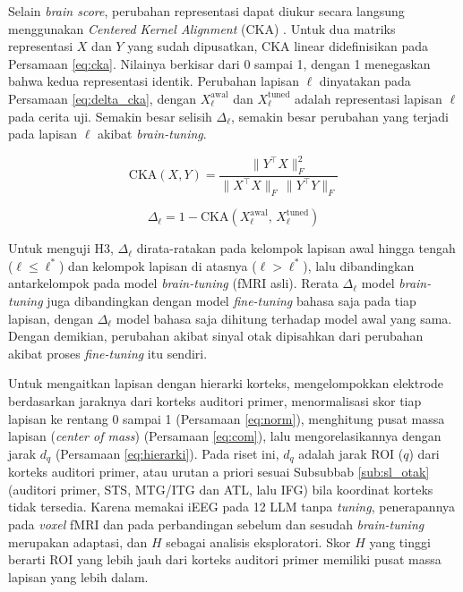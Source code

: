Selain \textit{brain score}, perubahan representasi dapat diukur secara langsung menggunakan \textit{Centered Kernel Alignment} (CKA) \autocite{kornblith2019similarity}. Untuk dua matriks representasi $X$ dan $Y$ yang sudah dipusatkan, CKA linear didefinisikan pada Persamaan \ref{eq:cka}. Nilainya berkisar dari 0 sampai 1, dengan 1 menegaskan bahwa kedua representasi identik. Perubahan lapisan $\ell$ dinyatakan pada Persamaan \ref{eq:delta_cka}, dengan $X^{\text{awal}}_{\ell}$ dan $X^{\text{tuned}}_{\ell}$ adalah representasi lapisan $\ell$ pada cerita uji. Semakin besar selisih $\Delta_\ell$, semakin besar perubahan yang terjadi pada lapisan $\ell$ akibat \textit{brain-tuning}.
 
\begin{equation}
  \mathrm{CKA}(X,Y) = \frac{\lVert Y^{\top}X \rVert_F^{2}}{\lVert X^{\top}X \rVert_F\,\lVert Y^{\top}Y \rVert_F}
  \label{eq:cka}
\end{equation}

\begin{equation}
  \Delta_\ell = 1 - \mathrm{CKA}\left(X^{\text{awal}}_{\ell},\, X^{\text{tuned}}_{\ell}\right)
  \label{eq:delta_cka}
\end{equation}

Untuk menguji H3, $\Delta_\ell$ dirata-ratakan pada kelompok lapisan awal hingga tengah ($\ell \le \ell^*$) dan kelompok lapisan di atasnya ($\ell > \ell^*$), lalu dibandingkan antarkelompok pada model \textit{brain-tuning} (fMRI asli). Rerata $\Delta_\ell$ model \textit{brain-tuning} juga dibandingkan dengan model \textit{fine-tuning} bahasa saja pada tiap lapisan, dengan $\Delta_\ell$ model bahasa saja dihitung terhadap model awal yang sama. Dengan demikian, perubahan akibat sinyal otak dipisahkan dari perubahan akibat proses \textit{fine-tuning} itu sendiri.

Untuk mengaitkan lapisan dengan hierarki korteks, \textcite{mischler2024contextual} mengelompokkan elektrode berdasarkan jaraknya dari korteks auditori primer, menormalisasi skor tiap lapisan ke rentang 0 sampai 1 (Persamaan \ref{eq:norm}), menghitung pusat massa lapisan (\textit{center of mass}) (Persamaan \ref{eq:com}), lalu mengorelasikannya dengan jarak $d_q$ (Persamaan \ref{eq:hierarki}). Pada riset ini, $d_q$ adalah jarak ROI ($q$) dari korteks auditori primer, atau urutan a priori sesuai Subsubbab \ref{sub:sl_otak} (auditori primer, STS, MTG/ITG dan ATL, lalu IFG) bila koordinat korteks tidak tersedia. Karena \textcite{mischler2024contextual} memakai iEEG pada 12 LLM tanpa \textit{tuning}, penerapannya pada \textit{voxel} fMRI dan pada perbandingan sebelum dan sesudah \textit{brain-tuning} merupakan adaptasi, dan $H$  sebagai analisis eksploratori. Skor $H$ yang tinggi berarti ROI yang lebih jauh dari korteks auditori primer memiliki pusat massa lapisan yang lebih dalam.
 
